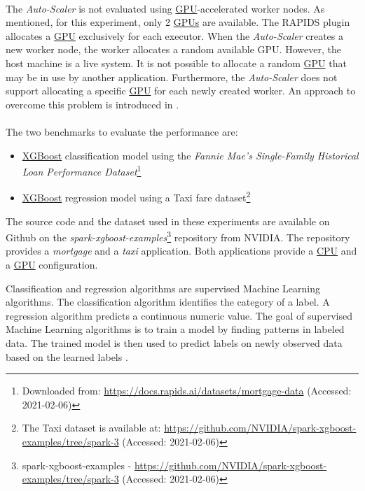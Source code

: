 \paragraph{}
The \textit{Auto-Scaler} is not evaluated using \hyperlink{abbr:gpu}{GPU}-accelerated worker nodes. As mentioned, for this experiment, only 2 \hyperlink{abbr:gpu}{GPUs} are available. The RAPIDS plugin allocates a \hyperlink{abbr:gpu}{GPU} exclusively for each executor. When the \textit{Auto-Scaler} creates a new worker node, the worker allocates a random available GPU.
However, the host machine is a live system. It is not possible to allocate a random \hyperlink{abbr:gpu}{GPU} that may be in use by another application. Furthermore, the \textit{Auto-Scaler} does not support allocating a specific \hyperlink{abbr:gpu}{GPU} for each newly created worker. An approach to overcome this problem is introduced in .

\paragraph{}
The two benchmarks to evaluate the performance are:
\begin{itemize}
\item \hyperlink{abbr:xgboost}{XGBoost} classification model using the \textit{Fannie Mae's Single-Family Historical Loan Performance Dataset}\footnote{Downloaded from: \url{https://docs.rapids.ai/datasets/mortgage-data} (Accessed: 2021-02-06)}\cite{Fannie2021Mortgage}

\item \hyperlink{abbr:xgboost}{XGBoost} regression model using a Taxi fare dataset\footnote{The Taxi dataset is available at: \url{https://github.com/NVIDIA/spark-xgboost-examples/tree/spark-3} (Accessed: 2021-02-06)}
\end{itemize}
The source code and the dataset used in these experiments are available on Github on the \textit{spark-xgboost-examples}\footnote{spark-xgboost-examples - \url{https://github.com/NVIDIA/spark-xgboost-examples/tree/spark-3} (Accessed: 2021-02-06)} repository from NVIDIA.
The repository provides a \textit{mortgage} and a \textit{taxi} application. Both applications provide a \hyperlink{abbr:cpu}{CPU} and a \hyperlink{abbr:gpu}{GPU} configuration.

Classification and regression algorithms are supervised Machine Learning algorithms.
The classification algorithm identifies the category of a label.
A regression algorithm predicts a continuous numeric value.
The goal of supervised Machine Learning algorithms is to train a model by finding patterns in labeled data. The trained model is then used to predict labels on newly observed data based on the learned labels \cite{Mcdonald2020SparkRapids}.


